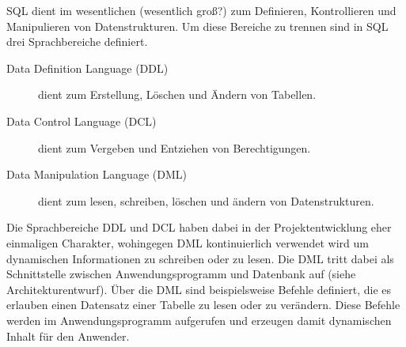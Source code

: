 SQL dient im wesentlichen (wesentlich groß?) zum Definieren, Kontrollieren und Manipulieren von Datenstrukturen. Um diese 
Bereiche zu trennen sind in SQL drei Sprachbereiche definiert.

\begin{description}
  \item[Data Definition Language (DDL)] dient zum Erstellung, Löschen und Ändern von Tabellen.
  \item[Data Control Language (DCL)] dient zum Vergeben und Entziehen von Berechtigungen.
  \item[Data Manipulation Language (DML)] dient zum lesen, schreiben, löschen und ändern von Datenstrukturen.
\end{description}

Die Sprachbereiche DDL und DCL haben dabei in der Projektentwicklung eher einmaligen Charakter, wohingegen DML 
kontinuierlich verwendet wird um dynamischen Informationen zu schreiben oder zu lesen. Die DML tritt dabei als 
Schnittstelle zwischen Anwendungsprogramm und Datenbank auf (siehe Architekturentwurf). Über die DML sind beispielsweise 
Befehle definiert, die es erlauben einen Datensatz einer Tabelle zu lesen oder zu verändern. Diese Befehle werden im 
Anwendungsprogramm aufgerufen und erzeugen damit dynamischen Inhalt für den Anwender.